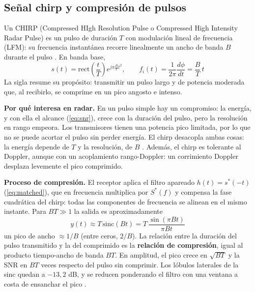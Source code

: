 \subsection{Señal chirp y compresión de pulsos}
\label{sec:chirp}

Un CHIRP (Compressed HIgh Resolution Pulse o Compressed High Intensity Radar Pulse) es un pulso de duración $T$ con modulación lineal de frecuencia (LFM): su frecuencia instantánea recorre linealmente un ancho de banda $B$ durante el pulso \cite{richards, cumming}. En banda base,
\begin{equation}
    s(t) = \mathrm{rect}\left(\frac{t}{T}\right) e^{j\pi \frac{B}{T} t^2},
    \qquad
    f_i(t) = \frac{1}{2\pi}\frac{d\phi}{dt} = \frac{B}{T} \, t
\end{equation}
La sigla resume su propósito: transmitir un pulso largo y de potencia moderada que, al recibirlo, se comprime en un pico angosto e intenso.

\textbf{Por qué interesa en radar.} En un pulso simple hay un compromiso: la energía, y con ella el alcance (\autoref{eq:snr}), crece con la duración del pulso, pero la resolución en rango empeora. Los transmisores tienen una potencia pico limitada, por lo que no se puede acortar el pulso sin perder energía. El chirp desacopla ambas cosas: la energía depende de $T$ y la resolución, de $B$ \cite{apunte, richards}. Además, el chirp es tolerante al Doppler, aunque con un acoplamiento rango-Doppler: un corrimiento Doppler desplaza levemente el pico comprimido.

\textbf{Proceso de compresión.} El receptor aplica el filtro apareado $h(t) = s^*(-t)$ (\autoref{eq:matched}), que en frecuencia multiplica por $S^*(f)$ y compensa la fase cuadrática del chirp: todas las componentes de frecuencia se alinean en el mismo instante. Para $BT \gg 1$ la salida es aproximadamente \cite{richards, cumming}
\begin{equation}
    y(t) \approx T \, \mathrm{sinc}(B t) = T \, \frac{\sin(\pi B t)}{\pi B t}
\end{equation}
un pico de ancho $\approx 1/B$ (entre ceros, $2/B$). La relación entre la duración del pulso transmitido y la del comprimido es la \textbf{relación de compresión}, igual al producto tiempo-ancho de banda $BT$. En amplitud, el pico crece en $\sqrt{BT}$ y la SNR en $BT$ veces respecto del pulso sin comprimir. Los lóbulos laterales de la sinc quedan a $-13{,}2$ dB, y se reducen ponderando el filtro con una ventana a costa de ensanchar el pico \cite{richards}.

